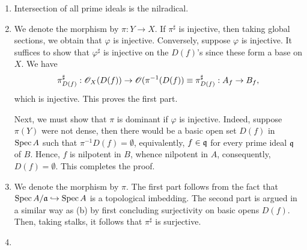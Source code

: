\begin{exercise}\hfill %
\begin{enumerate}[label=(\alph*)]
\item Intersection of all prime ideals is the nilradical.

\item We denote the morphism by $\pi: Y\to X$. If $\pi^\sharp$ is injective, then taking global sections, we obtain that $\varphi$ is injective. Conversely, suppose $\varphi$ is injective. It suffices to show that $\varphi^\sharp$ is injective on the $D(f)$'s since these form a base on $X$. We have 
\begin{equation*}
    \pi^\sharp_{D(f)}:\mathscr{O}_X(D(f)) \to \mathscr{O}(\pi^{-1}(D(f))\equiv \pi^\sharp_{D(f)}: A_f\to B_f,
\end{equation*}
which is injective. This proves the first part.

Next, we must show that $\pi$ is dominant if $\varphi$ is injective. Indeed, suppose $\pi(Y)$ were not dense, then there would be a basic open set $D(f)$ in $\operatorname{Spec} A$ such that $\pi^{-1}D(f) = \emptyset$, equivalently, $f\in\mathfrak{q}$ for every prime ideal $\mathfrak{q}$ of $B$. Hence, $f$ is nilpotent in $B$, whence nilpotent in $A$, consequently, $D(f) = \emptyset$. This completes the proof.

\item We denote the morphism by $\pi$. The first part follows from the fact that $\operatorname{Spec} A/\mathfrak{a}\hookrightarrow\operatorname{Spec} A$ is a topological imbedding. The second part is argued in a similar way as (b) by first concluding surjectivity on basic opens $D(f)$. Then, taking stalks, it follows that $\pi^\sharp$ is surjective.

\item 
\end{enumerate}
\end{exercise}